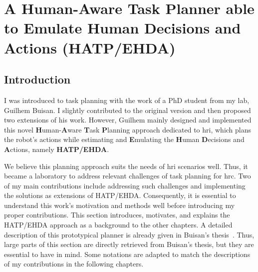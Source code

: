 \cleardoublepage

\ifdefined{}
\else
\setcounter{chapter}{1} %
\dominitoc
\faketableofcontents
\fi

\chapter{A Human-Aware Task Planner able to Emulate Human Decisions and Actions (HATP/EHDA)}
\label{chap:2}
\minitoc


\section{Introduction}

I was introduced to task planning with the work of a PhD student from my lab, Guilhem Buisan. I slightly contributed to the original version and then proposed two extensions of his work. However, Guilhem mainly designed and implemented this novel \textbf{H}uman-\textbf{A}ware \textbf{T}ask \textbf{P}lanning approach dedicated to \acrfull{hri}, which plans the robot's actions while estimating and \textbf{E}mulating the \textbf{H}uman \textbf{D}ecisions and \textbf{A}ctions, namely \textbf{HATP/EHDA}. 

We believe this planning approach suits the needs of \acrshort{hri} scenarios well. Thus, it became a laboratory to address relevant challenges of task planning for \acrshort{hrc}. 
Two of my main contributions include addressing such challenges and implementing the solutions as extensions of HATP/EHDA.   
Consequently, it is essential to understand this work's motivation and methods well before introducing my proper contributions. This section introduces, motivates, and explains the HATP/EHDA approach as a background to the other chapters. 
A detailed description of this prototypical planner is already given in Buisan's thesis~\cite{thesisBuisan21}. Thus, large parts of this section are directly retrieved from Buisan's thesis, but they are essential to have in mind. Some notations are adapted to match the descriptions of my contributions in the following chapters. 

